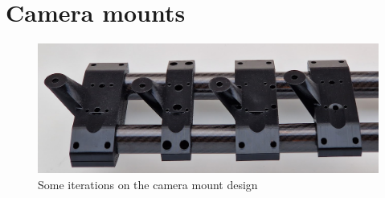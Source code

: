\section{Camera mounts}

\begin{figure}[H]
    \centering
    \includegraphics[width=\textwidth]{figures/3d_print/cam_mounts.png}
    \caption{Some iterations on the camera mount design}
    \label{fig:cam_mounts_iterations}
\end{figure}